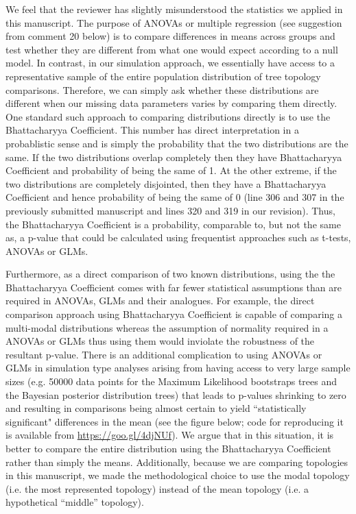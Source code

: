 \documentclass[11pt]{letter}
\begin{document}
\begin{letter}{}
We feel that the reviewer has slightly misunderstood the statistics we applied in this manuscript. The purpose of ANOVAs or multiple regression (see suggestion from comment 20 below) is to compare differences in means across groups and test whether they are different from what one would expect according to a null model. In contrast, in our simulation approach, we essentially have access to a representative sample of the entire population distribution of tree topology comparisons. Therefore, we can simply ask whether these distributions are different when our missing data parameters varies by comparing them directly. One standard such approach to comparing distributions directly is to use the Bhattacharyya Coefficient. This number has direct interpretation in a probablistic sense and is simply the probability that the two distributions are the same. If the two distributions overlap completely then they have Bhattacharyya Coefficient and probability of being the same of 1. At the other extreme, if the two distributions are completely disjointed, then they have a Bhattacharyya Coefficient and hence probability of being the same of 0 (line 306 and 307 in the previously submitted manuscript and lines 320 and 319 in our revision). Thus, the Bhattacharyya Coefficient is a probability, comparable to, but not the same as, a p-value that could be calculated using frequentist approaches such as t-tests, ANOVAs or GLMs.

Furthermore, as a direct comparison of two known distributions, using the the Bhattacharyya Coefficient comes with far fewer statistical assumptions than are required in ANOVAs, GLMs and their analogues. For example, the direct comparison approach using Bhattacharyya Coefficient is capable of comparing a multi-modal distributions whereas the assumption of normality required in a ANOVAs or GLMs thus using them would inviolate the robustness of the resultant p-value. There is an additional complication to using ANOVAs or GLMs in simulation type analyses arising from having access to very large sample sizes (e.g. 50000 data points for the Maximum Likelihood bootstraps trees and the Bayesian posterior distribution trees) that leads to p-values shrinking to zero and resulting in comparisons being almost certain to yield ``statistically significant" differences in the mean (see the figure below; code for reproducing it is available from \href{https://github.com/TGuillerme/Total_Evidence_Method-Missing_data/blob/master/Analysis/Comparing_distribution_example.R}{https://goo.gl/4djNUf}). We argue that in this situation, it is better to compare the entire distribution using the Bhattacharyya Coefficient rather than simply the means. Additionally, because we are comparing topologies in this manuscript, we made the methodological choice to use the modal topology (i.e. the most represented topology) instead of the mean topology (i.e. a hypothetical ``middle'' topology).


\end{letter}
\end{document}
